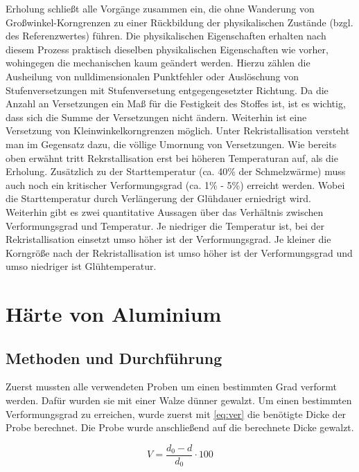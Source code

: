 \documentclass[
	a4paper,
	12pt,
	pagesize,
	ngerman
]{scrartcl}
\begin{document}
Erholung schließt alle Vorgänge zusammen ein, die ohne Wanderung von Großwinkel-Korngrenzen zu einer Rückbildung der physikalischen Zustände (bzgl. des Referenzwertes) führen.
Die physikalischen Eigenschaften erhalten nach diesem Prozess praktisch dieselben physikalischen Eigenschaften wie vorher, wohingegen die mechanischen kaum geändert werden. Hierzu zählen die Ausheilung von nulldimensionalen Punktfehler oder Auslöschung von  Stufenversetzungen mit Stufenversetung entgegengesetzter Richtung. Da die Anzahl an Versetzungen ein Maß für die Festigkeit des Stoffes ist, ist es wichtig, dass sich die Summe der Versetzungen nicht ändern. Weiterhin ist eine Versetzung von Kleinwinkelkorngrenzen möglich. 
Unter Rekristallisation versteht man im Gegensatz dazu, die völlige Umornung von Versetzungen.
Wie bereits oben erwähnt tritt Rekrstallisation erst bei höheren Temperaturan auf, als die Erholung. Zusätzlich zu der Starttemperatur (ca. 40\% der Schmelzwärme) muss auch noch ein kritischer Verformungsgrad (ca. 1\% - 5\%) erreicht werden. Wobei die Starttemperatur durch Verlängerung der Glühdauer erniedrigt wird. Weiterhin gibt es zwei quantitative Aussagen über das Verhältnis zwischen Verformungsgrad und Temperatur.
Je niedriger die Temperatur ist, bei der Rekristallisation einsetzt umso höher ist der Verformungsgrad.  
Je kleiner die Korngröße nach der Rekristallisation ist umso höher ist der Verformungsgrad und umso niedriger ist Glühtemperatur.  
 


\section{Härte von Aluminium}
\subsection{Methoden und Durchführung}
Zuerst mussten alle verwendeten Proben um einen bestimmten Grad verformt werden. Dafür wurden sie mit einer Walze dünner gewalzt. Um einen bestimmten Verformungsgrad zu erreichen, wurde zuerst mit \cref{eq:ver} die benötigte Dicke der Probe berechnet. Die Probe wurde anschließend auf die berechnete Dicke gewalzt.

\begin{equation}
V = \frac{d_0-d}{d_0} \cdot 100
\label{eq:ver}
\end{equation}
\end{document}
